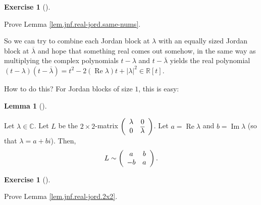 \documentclass[numbers=enddot,12pt,final,onecolumn,notitlepage]{scrartcl}%
\newcounter{exer}
\numberwithin{exer}{subsection}
\theoremstyle{definition}
\newtheorem{lem}[theo]{Lemma}
\newenvironment{lemma}[1][]
{\begin{lem}[#1]\begin{leftbar}}
{\end{leftbar}\end{lem}}
\newtheorem{exmp}[exer]{Exercise}
\newenvironment{exercise}[1][]
{\begin{exmp}[#1]\begin{leftbar}}
{\end{leftbar}\end{exmp}}
\begin{document}
\begin{exercise}
 Prove Lemma \ref{lem.jnf.real-jord.same-nums}.
\end{exercise}

So we can try to combine each Jordan block at $\lambda$ with an equally sized
Jordan block at $\overline{\lambda}$ and hope that something real comes out
somehow, in the same way as multiplying the complex polynomials $t-\lambda$
and $t-\overline{\lambda}$ yields the real polynomial $\left(  t-\lambda
\right)  \left(  t-\overline{\lambda}\right)  =t^{2}-2\left(
\operatorname*{Re}\lambda\right)  t+\left\vert \lambda\right\vert ^{2}%
\in\mathbb{R}\left[  t\right]  $.

How to do this? For Jordan blocks of size $1$, this is easy:

\begin{lemma}
\label{lem.jnf.real-jord.2x2}Let $\lambda\in\mathbb{C}$. Let $L$ be the
$2\times2$-matrix $\left(
\begin{array}
[c]{cc}%
\lambda & 0\\
0 & \overline{\lambda}%
\end{array}
\right)  $. Let $a=\operatorname*{Re}\lambda$ and $b=\operatorname*{Im}%
\lambda$ (so that $\lambda=a+bi$). Then,%
\[
L\sim\left(
\begin{array}
[c]{cc}%
a & b\\
-b & a
\end{array}
\right)  .
\]

\end{lemma}

\begin{exercise}
 Prove Lemma \ref{lem.jnf.real-jord.2x2}.
\end{exercise}
\end{document}

